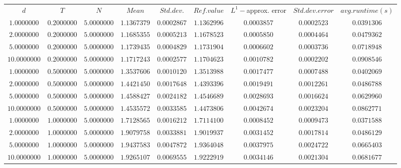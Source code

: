\begin{tabular}{ccccccccc}
$d$ & $T$ & $N$ & $Mean$ & $Std. dev.$ & $Ref. value$ & $L^1-$approx. error & $Std. dev. error$ & $avg. runtime (s)$\\
$1.0000000$ & $0.2000000$ & $5.0000000$ & $1.1367379$ & $0.0002867$ & $1.1362996$ & $0.0003857$ & $0.0002523$ & $0.0391306$\\
$2.0000000$ & $0.2000000$ & $5.0000000$ & $1.1685355$ & $0.0005213$ & $1.1678523$ & $0.0005850$ & $0.0004464$ & $0.0479362$\\
$5.0000000$ & $0.2000000$ & $5.0000000$ & $1.1739435$ & $0.0004829$ & $1.1731904$ & $0.0006602$ & $0.0003736$ & $0.0718948$\\
$10.0000000$ & $0.2000000$ & $5.0000000$ & $1.1717243$ & $0.0002577$ & $1.1704623$ & $0.0010782$ & $0.0002202$ & $0.0908546$\\
$1.0000000$ & $0.5000000$ & $5.0000000$ & $1.3537606$ & $0.0010120$ & $1.3513988$ & $0.0017477$ & $0.0007488$ & $0.0402069$\\
$2.0000000$ & $0.5000000$ & $5.0000000$ & $1.4421450$ & $0.0017648$ & $1.4393396$ & $0.0019491$ & $0.0012261$ & $0.0486788$\\
$5.0000000$ & $0.5000000$ & $5.0000000$ & $1.4588427$ & $0.0024182$ & $1.4546689$ & $0.0028693$ & $0.0016624$ & $0.0629960$\\
$10.0000000$ & $0.5000000$ & $5.0000000$ & $1.4535572$ & $0.0033585$ & $1.4473806$ & $0.0042674$ & $0.0023204$ & $0.0862771$\\
$1.0000000$ & $1.0000000$ & $5.0000000$ & $1.7128565$ & $0.0016212$ & $1.7114100$ & $0.0008452$ & $0.0009473$ & $0.0371588$\\
$2.0000000$ & $1.0000000$ & $5.0000000$ & $1.9079758$ & $0.0033881$ & $1.9019937$ & $0.0031452$ & $0.0017814$ & $0.0486129$\\
$5.0000000$ & $1.0000000$ & $5.0000000$ & $1.9437583$ & $0.0047872$ & $1.9364048$ & $0.0037975$ & $0.0024722$ & $0.0665403$\\
$10.0000000$ & $1.0000000$ & $5.0000000$ & $1.9265107$ & $0.0069555$ & $1.9222919$ & $0.0034146$ & $0.0021304$ & $0.0681677$\\
\end{tabular}
